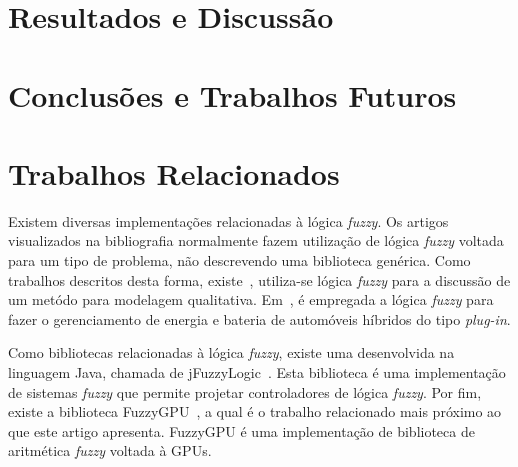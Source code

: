 \documentclass[12pt]{article}
\begin{document}
\section{Resultados e Discussão}	
\label{sec:resultados}	

\section{Conclusões e Trabalhos Futuros}
\label{sec:conclusoes}	
	
\section{Trabalhos Relacionados}
\label{sec:trabalhos}

	Existem diversas implementações relacionadas à lógica \textit{fuzzy}. Os artigos visualizados na bibliografia normalmente fazem utilização de lógica \textit{fuzzy} voltada para um tipo de problema, não descrevendo uma biblioteca genérica. Como trabalhos descritos desta forma, existe~\cite{sugeno:93}, utiliza-se lógica \textit{fuzzy} para a discussão de um metódo para modelagem qualitativa. Em~\cite{li:11}, é empregada a lógica \textit{fuzzy} para fazer o gerenciamento de energia e bateria de automóveis híbridos do tipo \textit{plug-in}.
	
	Como bibliotecas relacionadas à lógica \textit{fuzzy}, existe uma desenvolvida na linguagem Java, chamada de jFuzzyLogic~\cite{cingolani:12, cingolani:13}. Esta biblioteca é uma implementação de sistemas \textit{fuzzy} que permite projetar controladores de lógica \textit{fuzzy}. Por fim, existe a biblioteca FuzzyGPU~\cite{defour:14}, a qual é o trabalho relacionado mais próximo ao que este artigo apresenta. FuzzyGPU é uma implementação de biblioteca de aritmética \textit{fuzzy} voltada à GPUs.
 	


\end{document}
